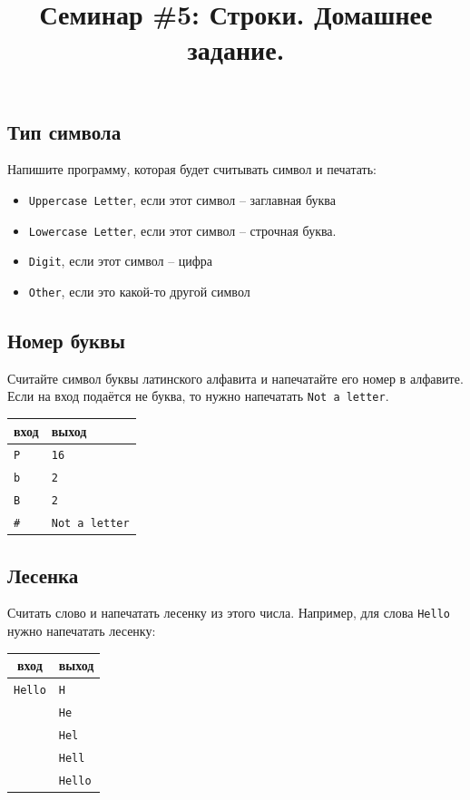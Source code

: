 \documentclass{article}
\begin{document}
\title{Семинар \#5: Строки. Домашнее задание.\vspace{-5ex}}\date{}\maketitle

\subsection{Тип символа}
Напишите программу, которая будет считывать символ и печатать:
\begin{itemize}
\item \texttt{Uppercase Letter}, если этот символ – заглавная буква
\item \texttt{Lowercase Letter}, если этот символ – строчная буква.
\item \texttt{Digit}, если этот символ – цифра
\item \texttt{Other}, если это какой-то другой символ
\end{itemize}

\subsection{Номер буквы}
Считайте символ буквы латинского алфавита и напечатайте его номер в алфавите. Если на вход подаётся не буква, то нужно напечатать \texttt{Not a letter}.
\begin{center}
\begin{tabular}{ l | l }
 вход & выход \\ \hline
 \texttt{P} & \texttt{16} \\
 \texttt{b} & \texttt{2} \\
 \texttt{B} & \texttt{2} \\
 \texttt{\#} & \texttt{Not a letter}\\ 
\end{tabular}
\end{center}

\subsection{Лесенка}
Считать слово и напечатать лесенку из этого числа. Например, для слова \texttt{Hello} нужно напечатать лесенку: 
\begin{center}
\begin{center}
\begin{tabular}{ c | l }
 вход & выход \\ \hline
 \texttt{Hello} & \texttt{H}  \\ 
 & \texttt{He} \\
 & \texttt{Hel} \\
 & \texttt{Hell} \\
 & \texttt{Hello}\\ 
\end{tabular}
\end{center}
\end{center}
\end{document}
